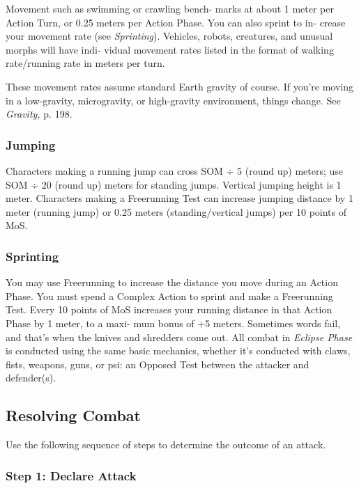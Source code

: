 Movement such as swimming or crawling bench-
marks at about 1 meter per Action Turn, or 0.25 
meters per Action Phase. You can also sprint to in-
crease your movement rate (see \textit{Sprinting}). Vehicles, 
robots, creatures, and unusual morphs will have indi-
vidual movement rates listed in the format of walking 
rate/running rate in meters per turn.

These movement rates assume standard Earth 
gravity of course. If you're moving in a low-gravity, 
microgravity, or high-gravity environment, things 
change. See \textit{Gravity,} p. 198.

\subsubsection{Jumping}

Characters making a running jump can cross SOM ÷ 
5 (round up) meters; use SOM ÷ 20 (round up) meters 
for standing jumps. Vertical jumping height is 1 meter. 
Characters making a Freerunning Test can increase 
jumping distance by 1 meter (running jump) or 0.25 
meters (standing/vertical jumps) per 10 points of MoS.

\subsubsection{Sprinting}

You may use Freerunning to increase the distance 
you move during an Action Phase. You must spend 
a Complex Action to sprint and make a Freerunning 
Test. Every 10 points of MoS increases your running 
distance in that Action Phase by 1 meter, to a maxi-
mum bonus of +5 meters.
Sometimes words fail, and that's when the knives and 
shredders come out. All combat in \textit{Eclipse Phase} is 
conducted using the same basic mechanics, whether it's 
conducted with claws, fists, weapons, guns, or psi: an 
Opposed Test between the attacker and defender(s).

\subsection{Resolving Combat}

Use the following sequence of steps to determine the 
outcome of an attack.

\subsubsection{Step 1: Declare Attack}

